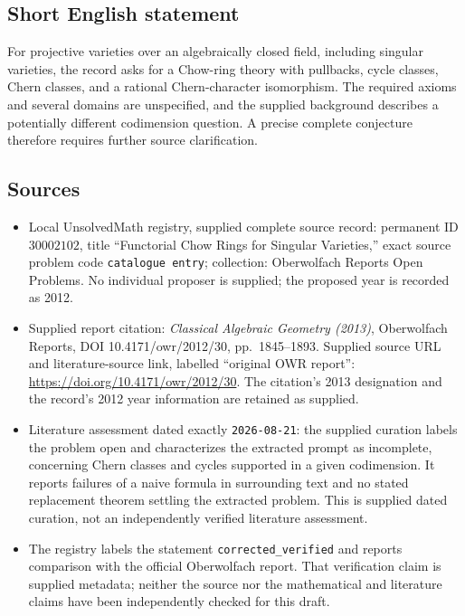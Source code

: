 \documentclass[11pt]{article}
\begin{document}
\subsection{Short English statement}
For projective varieties over an algebraically closed field, including singular varieties, the record asks for a Chow-ring theory with pullbacks, cycle classes, Chern classes, and a rational Chern-character isomorphism. The required axioms and several domains are unspecified, and the supplied background describes a potentially different codimension question. A precise complete conjecture therefore requires further source clarification.
\subsection{Sources}
\begin{itemize}
\item Local UnsolvedMath registry, supplied complete source record: permanent ID \(30002102\), title ``Functorial Chow Rings for Singular Varieties,'' exact source problem code \texttt{catalogue entry}; collection: Oberwolfach Reports Open Problems. No individual proposer is supplied; the proposed year is recorded as 2012.
\item Supplied report citation: \emph{Classical Algebraic Geometry (2013)}, Oberwolfach Reports, DOI 10.4171/owr/2012/30, pp.\ 1845--1893. Supplied source URL and literature-source link, labelled ``original OWR report'': \url{https://doi.org/10.4171/owr/2012/30}. The citation's 2013 designation and the record's 2012 year information are retained as supplied.
\item Literature assessment dated exactly \texttt{2026-08-21}: the supplied curation labels the problem open and characterizes the extracted prompt as incomplete, concerning Chern classes and cycles supported in a given codimension. It reports failures of a naive formula in surrounding text and no stated replacement theorem settling the extracted problem. This is supplied dated curation, not an independently verified literature assessment.
\item The registry labels the statement \texttt{corrected\_verified} and reports comparison with the official Oberwolfach report. That verification claim is supplied metadata; neither the source nor the mathematical and literature claims have been independently checked for this draft.
\end{itemize}
\end{document}
